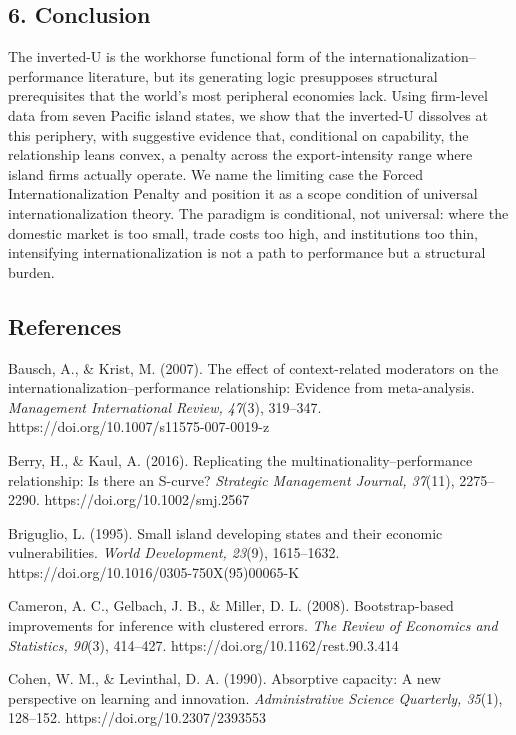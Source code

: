 \documentclass[
  12pt,a4paper]{article}
\begin{document}
\hypertarget{conclusion}{%
\subsection{6. Conclusion}\label{conclusion}}

The inverted-U is the workhorse functional form of the
internationalization--performance literature, but its generating logic
presupposes structural prerequisites that the world's most peripheral
economies lack. Using firm-level data from seven Pacific island states,
we show that the inverted-U dissolves at this periphery, with suggestive
evidence that, conditional on capability, the relationship leans
convex, a penalty across the export-intensity range where island firms
actually operate. We name the limiting case the Forced
Internationalization Penalty and position it as a scope condition of
universal internationalization theory. The paradigm is conditional, not
universal: where the domestic market is too small, trade costs too high,
and institutions too thin, intensifying internationalization is not a
path to performance but a structural burden.

\hypertarget{references}{%
\subsection{References}\label{references}}

Bausch, A., \& Krist, M. (2007). The effect of context-related
moderators on the internationalization--performance relationship:
Evidence from meta-analysis. \emph{Management International Review,
47}(3), 319--347. https://doi.org/10.1007/s11575-007-0019-z

Berry, H., \& Kaul, A. (2016). Replicating the
multinationality--performance relationship: Is there an S-curve?
\emph{Strategic Management Journal, 37}(11), 2275--2290.
https://doi.org/10.1002/smj.2567

Briguglio, L. (1995). Small island developing states and their economic
vulnerabilities. \emph{World Development, 23}(9), 1615--1632.
https://doi.org/10.1016/0305-750X(95)00065-K

Cameron, A. C., Gelbach, J. B., \& Miller, D. L. (2008). Bootstrap-based
improvements for inference with clustered errors. \emph{The Review of
Economics and Statistics, 90}(3), 414--427.
https://doi.org/10.1162/rest.90.3.414

Cohen, W. M., \& Levinthal, D. A. (1990). Absorptive capacity: A new
perspective on learning and innovation. \emph{Administrative Science
Quarterly, 35}(1), 128--152. https://doi.org/10.2307/2393553
\end{document}
